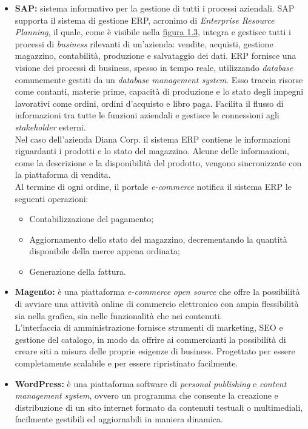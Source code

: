 \begin{itemize}
	\item \textbf{SAP:} sistema informativo per la gestione di tutti i processi aziendali. SAP supporta il sistema di gestione ERP, acronimo di \textit{Enterprise Resource Planning}, il quale, come è visibile nella \hyperlink{f1.3}{figura 1.3}, integra e gestisce tutti i processi di \textit{business} rilevanti di un'azienda: vendite, acquisti, gestione magazzino, contabilità, produzione e salvataggio dei dati. ERP fornisce una visione dei processi di business, spesso in tempo reale, utilizzando \textit{database} comunemente gestiti da un \textit{database management system}. Esso traccia risorse come contanti, materie prime, capacità di produzione e lo stato degli impegni lavorativi come ordini, ordini d'acquisto e libro paga. Facilita il flusso di informazioni tra tutte le funzioni aziendali e gestisce le connessioni agli \textit{stakeholder}\hyperlink{sh}{} esterni. \\
	Nel caso dell'azienda Diana Corp. il sistema ERP contiene le informazioni riguardanti i prodotti e lo stato del magazzino. Alcune delle informazioni, come la descrizione e la disponibilità del prodotto, vengono sincronizzate con la piattaforma di vendita. \\
	Al termine di ogni ordine, il portale \textit{e-commerce} notifica il sistema ERP le seguenti operazioni:
	\begin{itemize}
		\item Contabilizzazione del pagamento;
		\item Aggiornamento dello stato del magazzino, decrementando la quantità disponibile della merce appena ordinata;
		\item Generazione della fattura.
	\end{itemize}
	
	\item \textbf{Magento:} è una piattaforma \textit{e-commerce} \textit{open source} che offre la possibilità di avviare una attività online di commercio elettronico con ampia flessibilità sia nella grafica, sia nelle funzionalità che nei contenuti. \\
	L’interfaccia di amministrazione fornisce strumenti di marketing, SEO e gestione del catalogo, in modo da offrire ai commercianti la possibilità di creare siti a misura delle proprie esigenze di business. Progettato per essere completamente scalabile e per essere ripristinato facilmente.
	
	\item \textbf{WordPress:} è una piattaforma software di \textit{personal publishing} e \textit{content management system}, ovvero un programma che consente la creazione e distribuzione di un sito internet formato da contenuti testuali o multimediali, facilmente gestibili ed aggiornabili in maniera dinamica.	
\end{itemize}
 
